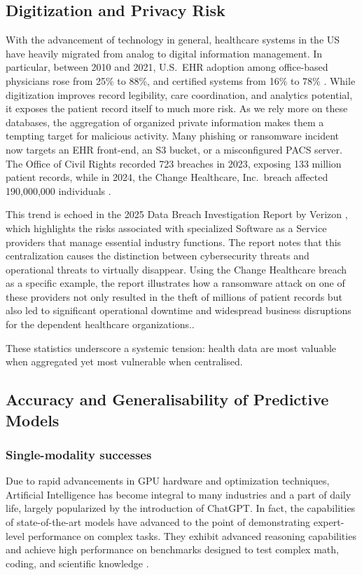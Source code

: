 \documentclass[12pt]{report}
\begin{document}
\subsection{Digitization and Privacy Risk}\label{sec:digitisation}
With the advancement of technology in general, healthcare systems in the US have heavily migrated from analog to digital information management. In particular, between 2010 and 2021, U.S.\ EHR adoption among office-based physicians rose from 25\% to 88\%, and certified systems from 16\% to 78\% \cite{ONC_EHR_Adoption_2021}. While digitization improves record legibility, care coordination, and analytics potential, it exposes the patient record itself to much more risk. As we rely more on these databases, the aggregation of organized private information makes them a tempting target for malicious activity. Many phishing or ransomware incident now targets an EHR front-end, an S3 bucket, or a misconfigured PACS server. The Office of Civil Rights recorded 723 breaches in 2023, exposing 133 million patient records, while in 2024, the Change Healthcare, Inc.\ breach affected 190,000,000 individuals \cite{HIPAAJournal_Breach_Report_2023}. 

This trend is echoed in the 2025 Data Breach Investigation Report by Verizon \cite{VerizonDBIR2025}, which highlights the risks associated with specialized Software as a Service providers that manage essential industry functions. The report notes that this centralization causes the distinction between cybersecurity threats and operational threats to virtually disappear. Using the Change Healthcare breach as a specific example, the report illustrates how a ransomware attack on one of these providers not only resulted in the theft of millions of patient records but also led to significant operational downtime and widespread business disruptions for the dependent healthcare organizations.. 

These statistics underscore a systemic tension: health data are most valuable when aggregated yet most vulnerable when centralised.

\subsection{Accuracy and Generalisability of Predictive Models}\label{sec:model_accuracy}
\subsubsection{Single-modality successes}
Due to rapid advancements in GPU hardware and optimization techniques, Artificial Intelligence has become integral to many industries and a part of daily life, largely popularized by the introduction of ChatGPT. In fact, the capabilities of state-of-the-art models have advanced to the point of demonstrating expert-level performance on complex tasks. They exhibit advanced reasoning capabilities and achieve high performance on benchmarks designed to test complex math, coding, and scientific knowledge \cite{OpenAI2025o3o4mini}.
\end{document}
